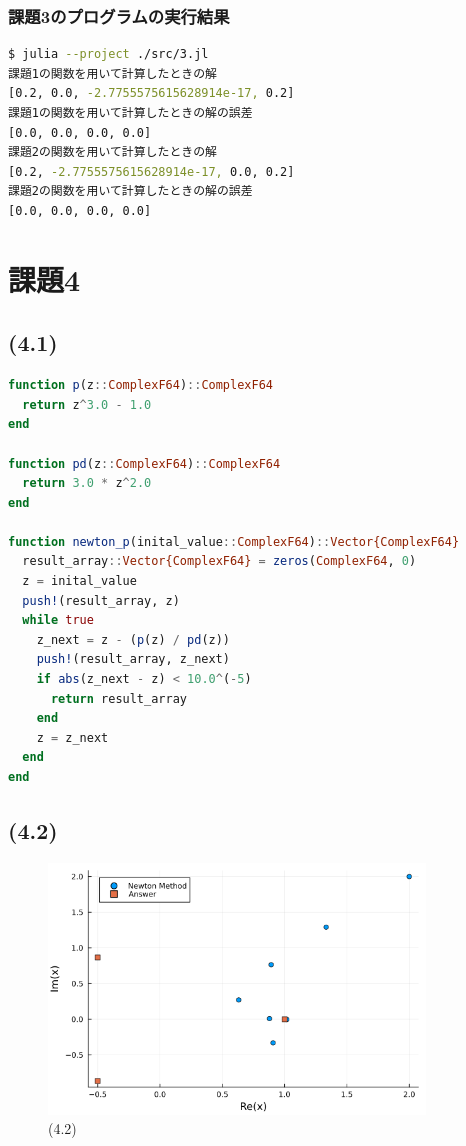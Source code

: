 \documentclass[uplatex, dvipdfmx, a4j,11pt]{jsarticle}
\begin{document}
\subsubsection*{課題3のプログラムの実行結果}
\begin{lstlisting}[title={課題3のプログラムの実行結果}, label=code:in, language=sh]
$ julia --project ./src/3.jl
課題1の関数を用いて計算したときの解
[0.2, 0.0, -2.7755575615628914e-17, 0.2]
課題1の関数を用いて計算したときの解の誤差
[0.0, 0.0, 0.0, 0.0]
課題2の関数を用いて計算したときの解
[0.2, -2.7755575615628914e-17, 0.0, 0.2]
課題2の関数を用いて計算したときの解の誤差
[0.0, 0.0, 0.0, 0.0]
\end{lstlisting}

\section*{課題4}
\subsection*{(4.1)}
\begin{lstlisting}[title={(4.1)}, label=code:in, language=Julia]
function p(z::ComplexF64)::ComplexF64
  return z^3.0 - 1.0
end

function pd(z::ComplexF64)::ComplexF64
  return 3.0 * z^2.0
end

function newton_p(inital_value::ComplexF64)::Vector{ComplexF64}
  result_array::Vector{ComplexF64} = zeros(ComplexF64, 0)
  z = inital_value
  push!(result_array, z)
  while true
    z_next = z - (p(z) / pd(z))
    push!(result_array, z_next)
    if abs(z_next - z) < 10.0^(-5)
      return result_array
    end
    z = z_next
  end
end
\end{lstlisting}

\subsection*{(4.2)}
\begin{figure}[h]
  \begin{center}
    \includegraphics[width=100mm]{newton.png}
    \caption{(4.2)}
  \end{center}
\end{figure}
\end{document}
